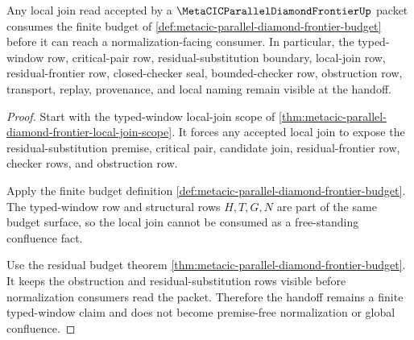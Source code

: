 \begin{theorem}
\label{thm:metacic-parallel-diamond-frontier-local-join}
Any local join read accepted by a $\MetaCICParallelDiamondFrontierUp$ packet consumes the finite budget of \autoref{def:metacic-parallel-diamond-frontier-budget} before it can reach a normalization-facing consumer. In particular, the typed-window row, critical-pair row, residual-substitution boundary, local-join row, residual-frontier row, closed-checker seal, bounded-checker row, obstruction row, transport, replay, provenance, and local naming remain visible at the handoff.
\end{theorem}
\begin{proof}
Start with the typed-window local-join scope of \autoref{thm:metacic-parallel-diamond-frontier-local-join-scope}. It forces any accepted local join to expose the residual-substitution premise, critical pair, candidate join, residual-frontier row, checker rows, and obstruction row.

Apply the finite budget definition \autoref{def:metacic-parallel-diamond-frontier-budget}. The typed-window row and structural rows $H,T,G,N$ are part of the same budget surface, so the local join cannot be consumed as a free-standing confluence fact.

Use the residual budget theorem \autoref{thm:metacic-parallel-diamond-frontier-budget}. It keeps the obstruction and residual-substitution rows visible before normalization consumers read the packet. Therefore the handoff remains a finite typed-window claim and does not become premise-free normalization or global confluence.
\end{proof}

